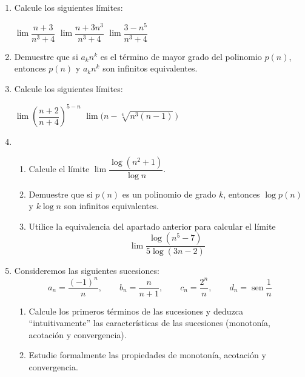 \begin{enumerate}

\item
Calcule los siguientes límites:
\setcontadoralph
\begin{centrar}
\nitem $\lim \dfrac{n+3}{n^3+4}$\hfill
\nitem $\lim \dfrac{n+3n^3}{n^3+4}$\hfill
\nitem $\lim \dfrac{3-n^5}{n^3+4}$
\end{centrar}

\item
Demuestre que si $a_kn^k$ es el término de mayor grado del polinomio $p(n)$, entonces $p(n)$ y $a_kn^k$ son infinitos equivalentes.

\item\label{ej:limgamma}
Calcule los siguientes límites:
\setcontadoralph
\begin{centrar}
\nitem $\lim\left( \dfrac{n+2}{n+4} \right)^{5-n}$\hfill
\nitem $\lim \big(n-\sqrt[4]{n^3(n-1)}\,\big)$
\end{centrar}

\item
\begin{enumerate}
\item
Calcule el límite $\lim \dfrac{\log (n^2+1)}{\log n}$.
\item
Demuestre que si $p(n)$ es un polinomio de grado $k$, entonces $\log p(n)$ y $k\log n$ son infinitos equivalentes.
\item
Utilice la equivalencia del apartado anterior para calcular el límite
\[
\lim\dfrac{\log(n^5-7)}{5\log(3n-2)}
\]
\end{enumerate}

\item Consideremos las siguientes sucesiones:
\[
a_n=\frac{(-1)^n}{n}, \qquad
b_n=\frac{n}{n+1},\qquad
c_n=\frac{2^n}{n},\qquad
\mathit{d}_n=\operatorname{sen}\dfrac1n
\]
\begin{enumerate}
\item
Calcule los primeros términos de las sucesiones y deduzca ``intuitivamente'' las  características de las sucesiones (monotonía, acotación y convergencia).
\item
Estudie formalmente las propiedades de monotonía, acotación y convergencia. 
\end{enumerate}


\end{enumerate}
